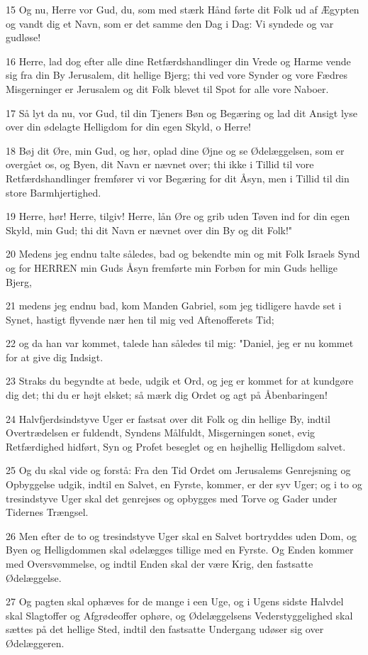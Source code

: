 \par 15 Og nu, Herre vor Gud, du, som med stærk Hånd førte dit Folk ud af Ægypten og vandt dig et Navn, som er det samme den Dag i Dag: Vi syndede og var gudløse!
\par 16 Herre, lad dog efter alle dine Retfærdshandlinger din Vrede og Harme vende sig fra din By Jerusalem, dit hellige Bjerg; thi ved vore Synder og vore Fædres Misgerninger er Jerusalem og dit Folk blevet til Spot for alle vore Naboer.
\par 17 Så lyt da nu, vor Gud, til din Tjeners Bøn og Begæring og lad dit Ansigt lyse over din ødelagte Helligdom for din egen Skyld, o Herre!
\par 18 Bøj dit Øre, min Gud, og hør, oplad dine Øjne og se Ødelæggelsen, som er overgået os, og Byen, dit Navn er nævnet over; thi ikke i Tillid til vore Retfærdshandlinger fremfører vi vor Begæring for dit Åsyn, men i Tillid til din store Barmhjertighed.
\par 19 Herre, hør! Herre, tilgiv! Herre, lån Øre og grib uden Tøven ind for din egen Skyld, min Gud; thi dit Navn er nævnet over din By og dit Folk!"
\par 20 Medens jeg endnu talte således, bad og bekendte min og mit Folk Israels Synd og for HERREN min Guds Åsyn fremførte min Forbøn for min Guds hellige Bjerg,
\par 21 medens jeg endnu bad, kom Manden Gabriel, som jeg tidligere havde set i Synet, hastigt flyvende nær hen til mig ved Aftenofferets Tid;
\par 22 og da han var kommet, talede han således til mig: "Daniel, jeg er nu kommet for at give dig Indsigt.
\par 23 Straks du begyndte at bede, udgik et Ord, og jeg er kommet for at kundgøre dig det; thi du er højt elsket; så mærk dig Ordet og agt på Åbenbaringen!
\par 24 Halvfjerdsindstyve Uger er fastsat over dit Folk og din hellige By, indtil Overtrædelsen er fuldendt, Syndens Målfuldt, Misgerningen sonet, evig Retfærdighed hidført, Syn og Profet beseglet og en højhellig Helligdom salvet.
\par 25 Og du skal vide og forstå: Fra den Tid Ordet om Jerusalems Genrejsning og Opbyggelse udgik, indtil en Salvet, en Fyrste, kommer, er der syv Uger; og i to og tresindstyve Uger skal det genrejses og opbygges med Torve og Gader under Tidernes Trængsel.
\par 26 Men efter de to og tresindstyve Uger skal en Salvet bortryddes uden Dom, og Byen og Helligdommen skal ødelægges tillige med en Fyrste. Og Enden kommer med Oversvømmelse, og indtil Enden skal der være Krig, den fastsatte Ødelæggelse.
\par 27 Og pagten skal ophæves for de mange i een Uge, og i Ugens sidste Halvdel skal Slagtoffer og Afgrødeoffer ophøre, og Ødelæggelsens Vederstyggelighed skal sættes på det hellige Sted, indtil den fastsatte Undergang udøser sig over Ødelæggeren.

